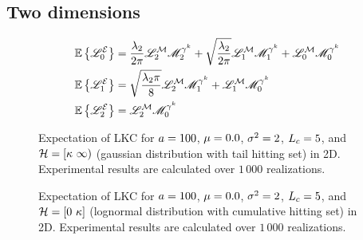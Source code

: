 \documentclass[12pt]{article}
\begin{document}
\newpage 
\subsection{Two dimensions}
\begin{subequations}
\begin{align}
  &\mathbb{E}\left\{\mathscr{L}_0^{\mathcal{E}}\right\} = \frac{\lambda_2}{2\pi}\mathscr{L}_2^{\mathcal{M}}\mathscr{M}^{\gamma^k}_2 + \sqrt{\frac{\lambda_2}{2\pi}}\mathscr{L}_1^{\mathcal{M}}\mathscr{M}^{\gamma^k}_1 + \mathscr{L}_0^{\mathcal{M}}\mathscr{M}^{\gamma^k}_0\\
  &\mathbb{E}\left\{\mathscr{L}_1^{\mathcal{E}}\right\} = \sqrt{\frac{\lambda_2\pi}{8}}\mathscr{L}_2^{\mathcal{M}}\mathscr{M}^{\gamma^k}_1 + \mathscr{L}_1^{\mathcal{M}}\mathscr{M}^{\gamma^k}_0\\
  &\mathbb{E}\left\{\mathscr{L}_2^{\mathcal{E}}\right\} = \mathscr{L}_2^{\mathcal{M}}\mathscr{M}^{\gamma^k}_0
\end{align}
\end{subequations}


\begin{figure}[!h]
  \centering
  \hspace*{\fill}
  \subfigure{\scalebox{0.5}{}}\hfill
  \subfigure{\scalebox{0.5}{}}\hfill
  \subfigure{\scalebox{0.5}{}}\hspace*{\fill}
  \caption{Expectation of LKC for $a=100$, $\mu=0.0$, $\sigma^2=2$, $L_c=5$, and $\mathcal{H}=[\kappa\ \infty)$ (gaussian distribution with tail hitting set) in 2D. Experimental results are calculated over $1\,000$ realizations.}
\end{figure}

\begin{figure}[!h]
  \centering
  \hspace*{\fill}
  \subfigure{\scalebox{0.5}{}}\hfill
  \subfigure{\scalebox{0.5}{}}\hfill
  \subfigure{\scalebox{0.5}{}}\hspace*{\fill}
  \caption{Expectation of LKC for $a=100$, $\mu=0.0$, $\sigma^2=2$, $L_c=5$, and $\mathcal{H}=[0\ \kappa]$ (lognormal distribution with cumulative hitting set) in 2D. Experimental results are calculated over $1\,000$ realizations.}
\end{figure}

\newpage
\end{document}
